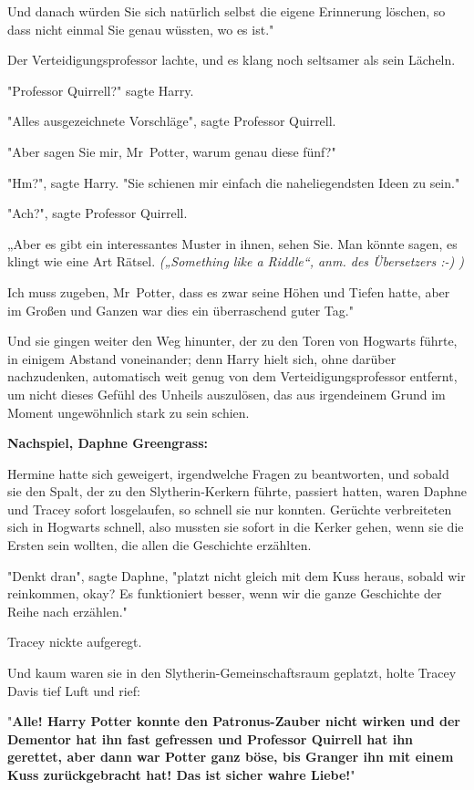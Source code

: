 {Und danach würden Sie sich natürlich selbst die eigene Erinnerung löschen, so dass nicht einmal Sie genau wüssten, wo es ist."

Der Verteidigungsprofessor lachte, und es klang noch seltsamer als sein Lächeln.

"Professor Quirrell?" sagte Harry.

"Alles ausgezeichnete Vorschläge", sagte Professor Quirrell.

"Aber sagen Sie mir, Mr~Potter, warum genau diese fünf?"

"Hm?", sagte Harry. "Sie schienen mir einfach die naheliegendsten Ideen zu sein."

"Ach?", sagte Professor Quirrell.

„Aber es gibt ein interessantes Muster in ihnen, sehen Sie. Man könnte sagen, es klingt wie eine Art Rätsel. \emph{(„Something like a Riddle“, anm. des Übersetzers :-) )}

Ich muss zugeben, Mr~Potter, dass es zwar seine Höhen und Tiefen hatte, aber im Großen und Ganzen war dies ein überraschend guter Tag."

Und sie gingen weiter den Weg hinunter, der zu den Toren von Hogwarts führte, in einigem Abstand voneinander; denn Harry hielt sich, ohne darüber nachzudenken, automatisch weit genug von dem Verteidigungsprofessor entfernt, um nicht dieses Gefühl des Unheils auszulösen, das aus irgendeinem Grund im Moment ungewöhnlich stark zu sein schien.

\textbf{Nachspiel, Daphne Greengrass:}

Hermine hatte sich geweigert, irgendwelche Fragen zu beantworten, und sobald sie den Spalt, der zu den Slytherin-Kerkern führte, passiert hatten, waren Daphne und Tracey sofort losgelaufen, so schnell sie nur konnten. Gerüchte verbreiteten sich in Hogwarts schnell, also mussten sie sofort in die Kerker gehen, wenn sie die Ersten sein wollten, die allen die Geschichte erzählten.

"Denkt dran", sagte Daphne, "platzt nicht gleich mit dem Kuss heraus, sobald wir reinkommen, okay? Es funktioniert besser, wenn wir die ganze Geschichte der Reihe nach erzählen."

Tracey nickte aufgeregt.

Und kaum waren sie in den Slytherin-Gemeinschaftsraum geplatzt, holte Tracey Davis tief Luft und rief:

"\textbf{Alle! Harry Potter konnte den Patronus-Zauber nicht wirken und der Dementor hat ihn fast gefressen und Professor Quirrell hat ihn gerettet, aber dann war Potter ganz böse, bis Granger ihn mit einem Kuss zurückgebracht hat! Das ist sicher wahre Liebe!}"

}
